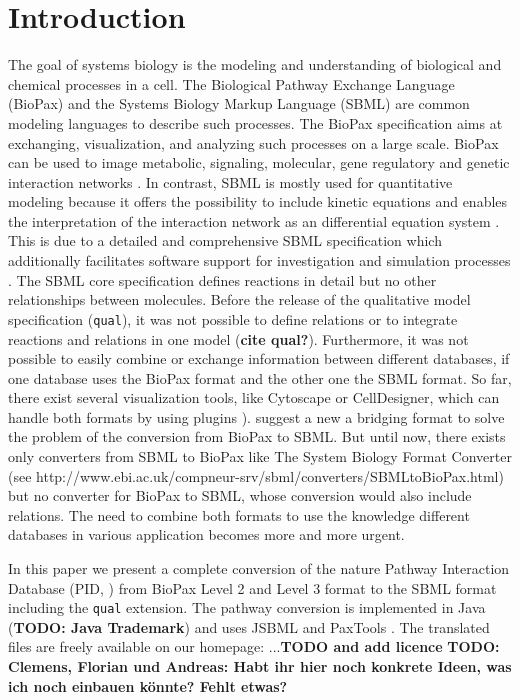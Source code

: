 \documentclass{bioinfo}
\newcommand{\qual}{\texttt{qual}}
\begin{document}
\section{Introduction}
The goal of systems biology is the modeling and understanding of biological and chemical processes in a cell.
The Biological Pathway Exchange Language (BioPax) and the Systems Biology Markup Language (SBML) are common modeling languages to describe such processes.
The BioPax specification aims at exchanging, visualization, and analyzing such processes on a large scale.
BioPax can be used to image metabolic, signaling, molecular, gene regulatory and genetic interaction networks \citep{Demir2010}.
In contrast, SBML is mostly used for quantitative modeling because it offers the possibility to include kinetic equations and enables the interpretation of the interaction network as an differential equation system \citep{Hucka2003}.
This is due to a detailed and comprehensive SBML specification which additionally facilitates software support for investigation and simulation processes \citep{Draeger2008}.
The SBML core specification defines reactions in detail but no other relationships between molecules.
Before the release of the qualitative model specification (\qual), it was not possible to define relations or to integrate reactions and relations in one model (\textbf{cite qual?}).
Furthermore, it was not possible to easily combine or exchange information between different databases, if one database uses the BioPax format and the other one the SBML format.
So far, there exist several visualization tools, like Cytoscape or CellDesigner, which can handle both formats by using plugins \citep{Mi2011, Draeger2008, Funahashi2007, Smoot2011a, Zinovyev2008}).
\citet*{Ruebenacker2009} suggest a new a bridging format to solve the problem of the conversion from BioPax to SBML.
But until now, there exists only converters from SBML to BioPax like The System Biology Format Converter (see http://www.ebi.ac.uk/compneur-srv/sbml/converters/SBMLtoBioPax.html) but no converter for BioPax to SBML, whose conversion would also include relations.
The need to combine both formats to use the knowledge different databases in various application becomes more and more urgent.

In this paper we present a complete conversion of the nature Pathway Interaction Database (PID, \citet{Schaefer2009}) from BioPax Level 2 and Level 3 format to the SBML format including the \qual{} extension.
The pathway conversion is implemented in Java (\textbf{TODO: Java Trademark}) and uses JSBML \citep{Draeger2011} and PaxTools \citep{Demir2010}.
The translated files are freely available on our homepage: ...\textbf{TODO and add licence}
\textbf{TODO: Clemens, Florian und Andreas: Habt ihr hier noch konkrete Ideen, was ich noch einbauen k\"onnte? Fehlt etwas?}
\end{document}
